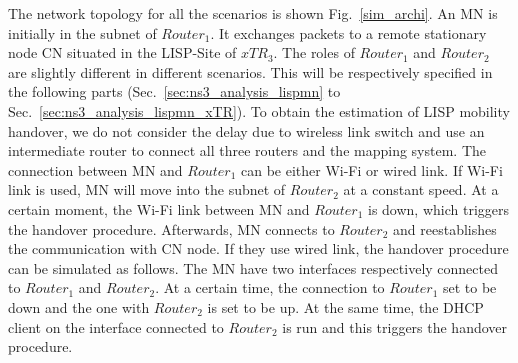 
The network topology for all the scenarios is shown Fig.~\ref{sim_archi}. An MN is initially in the subnet of $Router_1$. It exchanges packets to a remote stationary node CN situated in the LISP-Site of $xTR_3$. The roles of $Router_1$ and $Router_2$ are slightly different in different scenarios. This will be respectively specified in the following parts (Sec.~\ref{sec:ns3_analysis_lispmn} to Sec.~\ref{sec:ns3_analysis_lispmn_xTR}). To obtain the estimation of LISP mobility handover, we do not consider the delay due to wireless link switch and use an intermediate router to connect all three routers and the mapping system. The connection between MN and $Router_1$ can be either Wi-Fi or wired link. If Wi-Fi link is used, MN will move into the subnet of $Router_2$ at a constant speed. At a certain moment, the Wi-Fi link between MN and $Router_1$ is down, which triggers the handover procedure. Afterwards, MN connects to $Router_2$ and reestablishes the communication with CN node. If they use wired link, the handover procedure can be simulated as follows. The MN have two interfaces respectively connected to $Router_1$ and $Router_2$. At a certain time, the connection to $Router_1$ set to be down and the one with $Router_2$ is set to be up. At the same time, the DHCP client on the interface connected to $Router_2$ is run and this triggers the handover procedure.


